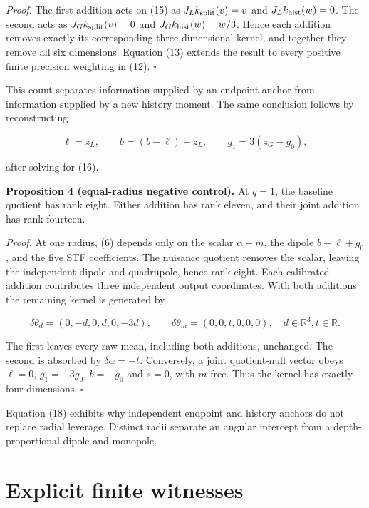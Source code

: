 \documentclass[aps,prd,preprint,onecolumn,notitlepage]{revtex4-2}
\begin{document}
\emph{Proof.} The first addition acts on (15) as \(J_Lk_{\rm split}(v)=v\) and \(J_Lk_{\rm hist}(w)=0\). The second acts as \(J_Gk_{\rm split}(v)=0\) and \(J_Gk_{\rm hist}(w)=w/3\). Hence each addition removes exactly its corresponding three-dimensional kernel, and together they remove all six dimensions. Equation (13) extends the result to every positive finite precision weighting in (12). \(\square\)

This count separates information supplied by an endpoint anchor from information supplied by a new history moment. The same conclusion follows by reconstructing

\[
\ell=z_L,\qquad b=(b-\ell)+z_L,\qquad
g_1=3(z_G-g_0),                                         \tag{17}
\]

after solving for (16).

\textbf{Proposition 4 (equal-radius negative control).} At \(q=1\), the baseline quotient has rank eight. Either addition has rank eleven, and their joint addition has rank fourteen.

\emph{Proof.} At one radius, (6) depends only on the scalar \(\alpha+m\), the dipole \(b-\ell+g_0\), and the five STF coefficients. The nuisance quotient removes the scalar, leaving the independent dipole and quadrupole, hence rank eight. Each calibrated addition contributes three independent output coordinates. With both additions the remaining kernel is generated by

\[
\delta\theta_d=(0,-d,0,d,0,-3d),\qquad
\delta\theta_m=(0,0,t,0,0,0),\quad d\in\mathbb R^3, t\in\mathbb R.
                                                               \tag{18}
\]

The first leaves every raw mean, including both additions, unchanged. The second is absorbed by \(\delta\alpha=-t\). Conversely, a joint quotient-null vector obeys \(\ell=0\), \(g_1=-3g_0\), \(b=-g_0\) and \(s=0\), with \(m\) free. Thus the kernel has exactly four dimensions. \(\square\)

Equation (18) exhibits why independent endpoint and history anchors do not replace radial leverage. Distinct radii separate an angular intercept from a depth-proportional dipole and monopole.

\hypertarget{explicit-finite-witnesses}{%
\section{Explicit finite witnesses}\label{explicit-finite-witnesses}}
\end{document}
